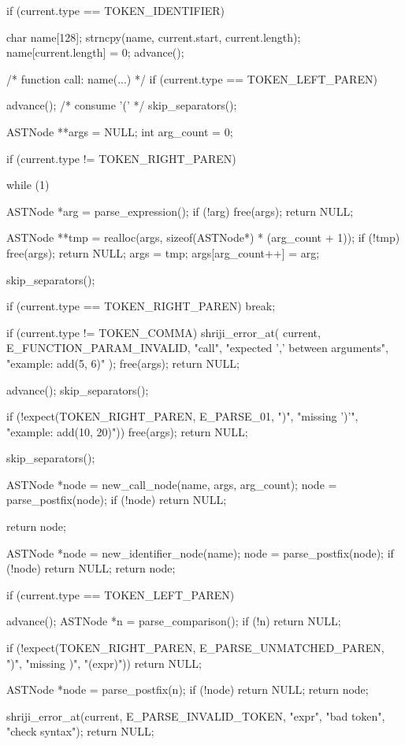 \documentclass{article}
\begin{document}
{    if (current.type == TOKEN_IDENTIFIER) {

        char name[128];
        strncpy(name, current.start, current.length);
        name[current.length] = 0;
        advance();






/* function call: name(...) */
if (current.type == TOKEN_LEFT_PAREN) {

    advance(); /* consume '(' */
    skip_separators();

    ASTNode **args = NULL;
    int arg_count = 0;

    if (current.type != TOKEN_RIGHT_PAREN) {
        while (1) {

            ASTNode *arg = parse_expression();
            if (!arg) {
                free(args);
                return NULL;
            }

            ASTNode **tmp = realloc(args, sizeof(ASTNode*) * (arg_count + 1));
            if (!tmp) {
                free(args);
                return NULL;
            }
            args = tmp;
            args[arg_count++] = arg;

            skip_separators();

            if (current.type == TOKEN_RIGHT_PAREN)
                break;

            if (current.type != TOKEN_COMMA) {
                shriji_error_at(
                    current,
                    E_FUNCTION_PARAM_INVALID,
                    "call",
                    "expected ',' between arguments",
                    "example: add(5, 6)"
                );
                free(args);
                return NULL;
            }

            advance();
            skip_separators();
        }
    }

    if (!expect(TOKEN_RIGHT_PAREN, E_PARSE_01, ")", "missing ')'",
                "example: add(10, 20)")) {
        free(args);
        return NULL;
    }

    skip_separators();

    ASTNode *node = new_call_node(name, args, arg_count);
    node = parse_postfix(node);
    if (!node) return NULL;

    return node;
}


        ASTNode *node = new_identifier_node(name);
node = parse_postfix(node);
if (!node) return NULL;
return node;
    }

    if (current.type == TOKEN_LEFT_PAREN) {
        advance();
        ASTNode *n = parse_comparison();
        if (!n) return NULL;

        if (!expect(TOKEN_RIGHT_PAREN, E_PARSE_UNMATCHED_PAREN, ")", "missing )", "(expr)"))
            return NULL;

        ASTNode *node = parse_postfix(n);
if (!node) return NULL;
return node;
    }

    shriji_error_at(current, E_PARSE_INVALID_TOKEN, "expr", "bad token", "check syntax");
    return NULL;
}
\end{document}
